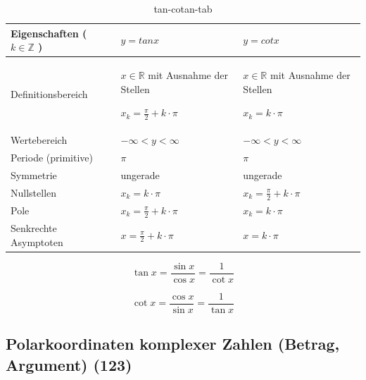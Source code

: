 \begin{table}[H]
\begin{tabular}{|l|l|l|}
\hline
Eigenschaften    ( $k \in \mathbb { Z }$ )     & $y= tan x$ & $y= cot x$ \\ \hline \hline
Definitionsbereich    &    \parbox[t]{2in}{ $x \in \mathbb { R }$ mit Ausnahme der Stellen \par  $x _ { k } = \frac { \pi } { 2} + k \cdot \pi$   }  &   \parbox[t]{2in}{   $x \in \mathbb { R }$ mit Ausnahme der Stellen  \par  $x _ { k } =  k \cdot \pi$   }    \\ 
Wertebereich          &   $- \infty < y < \infty$       &  $- \infty < y < \infty$          \\ 
Periode (primitive)   &   $\pi$       &      $\pi$     \\ 
Symmetrie             &    ungerade      &  ungerade         \\ 
Nullstellen           &     $x _ { k } = k \cdot \pi$     &      $x _ { k } = \frac { \pi } { 2} + k \cdot \pi$     \\ 
Pole                  &    $x _ { k } = \frac { \pi } { 2} + k \cdot \pi$      &    $x _ { k } = k \cdot \pi$       \\ 
Senkrechte Asymptoten &    $x = \frac { \pi } { 2} + k \cdot \pi$      &      $x = k \cdot \pi$        \\ \hline
\end{tabular}
\caption{tan-cotan-tab}
\label{tan-cotan-tab}
\end{table}

\begin{leftbar}
\noindent\begin{minipage}{.5\linewidth}
\begin{equation}
\tan x = \frac { \sin x } { \cos x } = \frac { 1} { \cot x }
\end{equation}
\end{minipage}
\begin{minipage}{.5\linewidth}
\begin{equation}
\cot x = \frac { \cos x } { \sin x } = \frac { 1} { \tan x }
\end{equation}
\end{minipage}
\end{leftbar}

\subsection{Polarkoordinaten komplexer Zahlen (Betrag, Argument) (123)}

